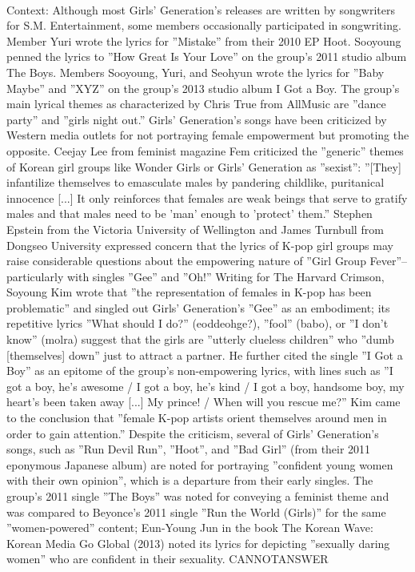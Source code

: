 \documentclass[11pt,a4paper, onecolumn]{article}
\begin{document}
\\ Context: Although most Girls' Generation's releases are written by songwriters for S.M. Entertainment, some members occasionally participated in songwriting. Member Yuri wrote the lyrics for ''Mistake'' from their 2010 EP Hoot. Sooyoung penned the lyrics to ''How Great Is Your Love'' on the group's 2011 studio album The Boys. Members Sooyoung, Yuri, and Seohyun wrote the lyrics for ''Baby Maybe'' and ''XYZ'' on the group's 2013 studio album I Got a Boy. The group's main lyrical themes as characterized by Chris True from AllMusic are ''dance party'' and ''girls night out.'' Girls' Generation's songs have been criticized by Western media outlets for not portraying female empowerment but promoting the opposite. Ceejay Lee from feminist magazine Fem criticized the ''generic'' themes of Korean girl groups like Wonder Girls or Girls' Generation as ''sexist'': ''[They] infantilize themselves to emasculate males by pandering childlike, puritanical innocence [...] It only reinforces that females are weak beings that serve to gratify males and that males need to be 'man' enough to 'protect' them.'' Stephen Epstein from the Victoria University of Wellington and James Turnbull from Dongseo University expressed concern that the lyrics of K-pop girl groups may raise considerable questions about the empowering nature of ''Girl Group Fever''--particularly with singles ''Gee'' and ''Oh!'' Writing for The Harvard Crimson, Soyoung Kim wrote that ''the representation of females in K-pop has been problematic'' and singled out Girls' Generation's ''Gee'' as an embodiment; its repetitive lyrics ''What should I do?'' (eoddeohge?), ''fool'' (babo), or ''I don't know'' (molra) suggest that the girls are ''utterly clueless children'' who ''dumb [themselves] down'' just to attract a partner. He further cited the single ''I Got a Boy'' as an epitome of the group's non-empowering lyrics, with lines such as ''I got a boy, he's awesome / I got a boy, he's kind / I got a boy, handsome boy, my heart's been taken away [...] My prince! / When will you rescue me?'' Kim came to the conclusion that ''female K-pop artists orient themselves around men in order to gain attention.'' Despite the criticism, several of Girls' Generation's songs, such as ''Run Devil Run'', ''Hoot'', and ''Bad Girl'' (from their 2011 eponymous Japanese album) are noted for portraying ''confident young women with their own opinion'', which is a departure from their early singles. The group's 2011 single ''The Boys'' was noted for conveying a feminist theme and was compared to Beyonce's 2011 single ''Run the World (Girls)'' for the same ''women-powered'' content; Eun-Young Jun in the book The Korean Wave: Korean Media Go Global (2013) noted its lyrics for depicting ''sexually daring women'' who are confident in their sexuality. CANNOTANSWER
\end{document}
